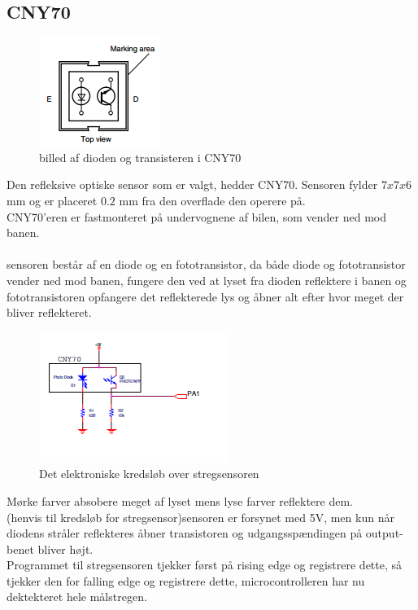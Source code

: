 \subsection{CNY70}
\begin{figure}
\includegraphics[scale=1.0]{./Graphics/CNY70-Diode}
\caption{billed af dioden og transisteren i CNY70}
\label{CNY70}
\end{figure}
Den refleksive optiske sensor som er valgt, hedder CNY70. Sensoren fylder $7x7x6$ mm og er placeret $0.2$ mm fra den overflade den operere på. \\
CNY70'eren er fastmonteret på undervognene af bilen, som vender ned mod banen.\\
\\
sensoren består af en diode og en fototransistor, da både diode og fototransistor vender ned mod banen, fungere den ved at lyset fra dioden reflektere i banen og fototransistoren opfangere det reflekterede lys og åbner alt efter hvor meget der bliver reflekteret. \\
\begin{figure}
\includegraphics[scale=1.0]{./Graphics/Stregsensor_kredslob}
\caption{Det elektroniske kredsløb over stregsensoren}
\label{Stregsensor}
\end{figure}
Mørke farver absobere meget af lyset mens lyse farver reflektere dem. \\
(henvis til kredsløb for stregsensor)sensoren er forsynet med 5V, men kun når diodens stråler reflekteres åbner transistoren og udgangsspændingen på output-benet bliver højt.\\
Programmet til stregsensoren tjekker først på rising edge og registrere dette, så tjekker den for falling edge og registrere dette, microcontrolleren har nu dektekteret hele målstregen. \\

